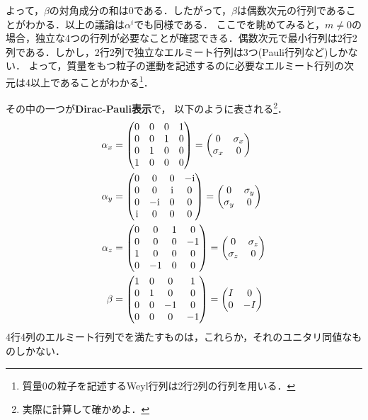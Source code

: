 \documentclass{report}
\begin{document}
よって，$\beta$の対角成分の和は0である．したがって，$\beta$は偶数次元の行列であることがわかる．以上の議論は$\alpha^i$でも同様である．
ここでを眺めてみると，$m\neq0$の場合，独立な4つの行列が必要なことが確認できる．偶数次元で最小行列は2行2列である．しかし，2行2列で独立なエルミート行列は3つ(Pauli行列など)しかない．
よって，質量をもつ粒子の運動を記述するのに必要なエルミート行列の次元は4以上であることがわかる\footnote{質量0の粒子を記述するWeyl行列は2行2列の行列を用いる．}．

その中の一つが\textbf{Dirac-Pauli表示}で，
以下のように表される\footnote{実際に計算して確かめよ．}．
\begin{align}
  \alpha_x &= 
  \begin{pmatrix}
    0 & 0 & 0 & 1\\
    0 & 0 & 1 & 0\\
    0 & 1 & 0 & 0\\
    1 & 0 & 0 & 0\\
  \end{pmatrix}
  =
  \begin{pmatrix}
    0 & \sigma_x\\
    \sigma_x & 0
  \end{pmatrix}\\
  \alpha_y &= 
  \begin{pmatrix}
    0 & 0 & 0 & -\mathrm{i}\\
    0 & 0 & \mathrm{i} & 0\\
    0 & -\mathrm{i} & 0 & 0\\
    \mathrm{i} & 0 & 0 & 0\\
  \end{pmatrix}
  =
  \begin{pmatrix}
    0 & \sigma_y\\
    \sigma_y & 0
  \end{pmatrix}\\
  \alpha_z &= 
  \begin{pmatrix}
    0 & 0 & 1 & 0\\
    0 & 0 & 0 & -1\\
    1 & 0 & 0 & 0\\
    0 & -1 & 0 & 0\\
  \end{pmatrix}
  =
  \begin{pmatrix}
    0 & \sigma_z\\
    \sigma_z & 0
  \end{pmatrix}\\
  \beta &= 
  \begin{pmatrix}
    1 & 0 & 0 & 1\\
    0 & 1 & 0 & 0\\
    0 & 0 & -1 & 0\\
    0 & 0 & 0 & -1\\
  \end{pmatrix}
  =
  \begin{pmatrix}
    I & 0\\
    0 & -I
  \end{pmatrix}
\end{align}
4行4列のエルミート行列でを満たすものは，これらか，それのユニタリ同値なものしかない．
\end{document}

